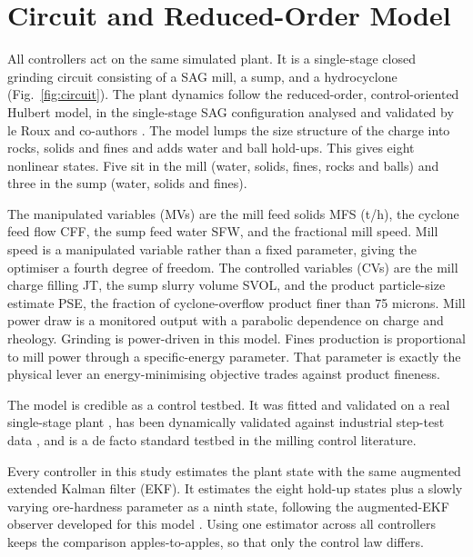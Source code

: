 \documentclass[conference]{IEEEtran}
\begin{document}
\section{Circuit and Reduced-Order Model}

All controllers act on the same simulated plant. It is a single-stage
closed grinding circuit consisting of a SAG mill, a sump, and a
hydrocyclone (Fig.~\ref{fig:circuit}). The plant dynamics follow the reduced-order,
control-oriented Hulbert model, in the single-stage SAG configuration
analysed and validated by le Roux and co-authors \cite{leroux2013}. The
model lumps the size structure of the charge into rocks, solids and fines
and adds water and ball hold-ups. This gives eight nonlinear states. Five
sit in the mill (water, solids, fines, rocks and balls) and three in the
sump (water, solids and fines).

The manipulated variables (MVs) are the mill feed solids MFS (t/h), the
cyclone feed flow CFF, the sump feed water SFW, and the fractional mill
speed. Mill speed is a manipulated variable rather than a fixed parameter,
giving the optimiser a fourth degree of freedom. The controlled variables (CVs) are the mill charge
filling JT, the sump slurry volume SVOL, and the product particle-size
estimate PSE, the fraction of cyclone-overflow product finer than 75
microns. Mill power draw is a monitored output with a parabolic dependence
on charge and rheology. Grinding is power-driven in this model. Fines
production is proportional to mill power through a specific-energy
parameter. That parameter is exactly the physical lever an
energy-minimising objective trades against product fineness.

The model is credible as a control testbed. It was fitted and validated
on a real single-stage plant \cite{leroux2013}, has been dynamically
validated against industrial step-test data \cite{leroux2022}, and is a
de facto standard testbed in the milling control literature.

Every controller in this study estimates the plant state with the same
augmented extended Kalman filter (EKF). It estimates the eight hold-up
states plus a slowly varying ore-hardness parameter as a ninth state,
following the augmented-EKF observer developed for this model
\cite{leroux2017}. Using one estimator across all controllers
keeps the comparison apples-to-apples, so that only the control law
differs.
\end{document}
